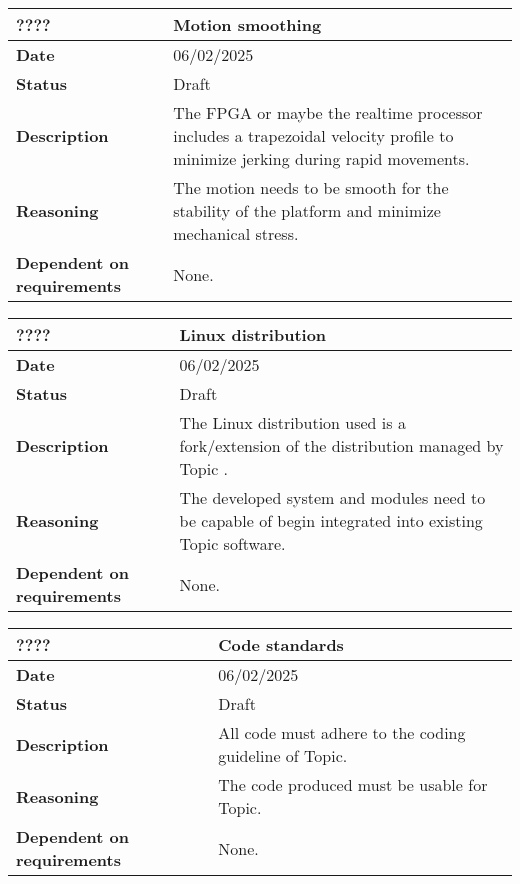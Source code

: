 \documentclass{article}
\begin{document}
\begin{table}[H]
    \renewcommand{\arraystretch}{1.3}
    \begin{tabular}{|l|p{10cm}|}
        \hline
        \rowcolor{gray!50}
        \textbf{????} & \textbf{Motion smoothing} \\ \hline
        \textbf{Date} & 06/02/2025 \\ \hline
        \textbf{Status} & Draft \\ \hline
        \textbf{Description} & The FPGA or maybe the realtime processor includes a trapezoidal velocity profile to minimize jerking during rapid movements. \\ \hline
        \textbf{Reasoning} & The motion needs to be smooth for the stability of the platform and minimize mechanical stress. \\ \hline
        \textbf{Dependent on requirements} & None. \\ \hline
    \end{tabular}
\end{table}

\begin{table}[H]
    \renewcommand{\arraystretch}{1.3}
    \begin{tabular}{|l|p{10cm}|}
        \hline
        \rowcolor{gray!50}
        \textbf{????} & \textbf{Linux distribution} \\ \hline
        \textbf{Date} & 06/02/2025 \\ \hline
        \textbf{Status} & Draft \\ \hline
        \textbf{Description} & The Linux distribution used is a fork/extension of the distribution managed by Topic \cite{TopicLinuxDistro}. \\ \hline
        \textbf{Reasoning} & The developed system and modules need to be capable of begin integrated into existing Topic software. \\ \hline
        \textbf{Dependent on requirements} & None. \\ \hline
    \end{tabular}
\end{table}

\begin{table}[H]
    \renewcommand{\arraystretch}{1.3}
    \begin{tabular}{|l|p{10cm}|}
        \hline
        \rowcolor{gray!50}
        \textbf{????} & \textbf{Code standards} \\ \hline
        \textbf{Date} & 06/02/2025 \\ \hline
        \textbf{Status} & Draft \\ \hline
        \textbf{Description} & All code must adhere to the coding guideline of Topic. \\ \hline
        \textbf{Reasoning} & The code produced must be usable for Topic. \\ \hline
        \textbf{Dependent on requirements} & None. \\ \hline
    \end{tabular}
\end{table}
\end{document}
